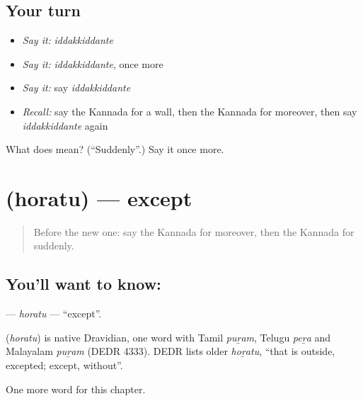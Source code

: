 \subsection*{Your turn}
\begin{itemize}
\raggedright
  \item \emph{Say it:} \emph{iddakkiddante}
  \item \emph{Say it:} \emph{iddakkiddante}, once more
  \item \emph{Say it:} say \emph{iddakkiddante}
  \item \emph{Recall:} say the Kannada for a wall, then the Kannada for moreover, then say \emph{iddakkiddante} again
\end{itemize}

\begin{tcolorbox}[breakable,colback=teal!4,colframe=teal!35!black,title={Before you move on}]
What does  mean? (\textquotedblleft{}Suddenly\textquotedblright{}.) Say it once more.
\end{tcolorbox}
\section[\texorpdfstring{\kn{ಹೊರತು} (horatu)}{ಹೊರತು (horatu)}]{ (horatu) — except}

\label{lesson:KA-C288-horatu}



\begin{quote}
Before the new one: say the Kannada for moreover, then the Kannada for suddenly.
\end{quote}

\subsection*{You'll want to know: }
\textbf{} — \emph{horatu} — \textquotedblleft{}except\textquotedblright{}.

\begin{cousinweb}
\textbf{} (\emph{horatu}) is native Dravidian, one word with Tamil \emph{puṟam}, Telugu \emph{peṟa} and Malayalam \emph{puṟam} (DEDR 4333). DEDR lists older \emph{hoṟatu}, \textquotedblleft{}that is outside, excepted; except, without\textquotedblright{}.
\end{cousinweb}

\begin{grammarlens}[title={What you've built}]
One more word for this chapter.
\end{grammarlens}


